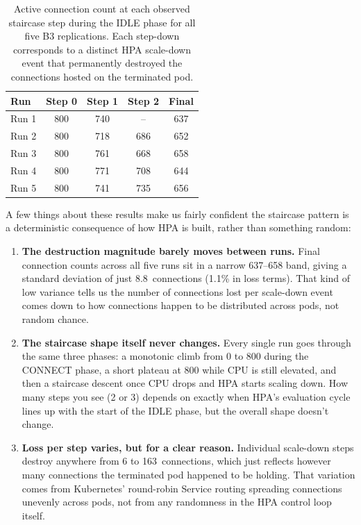 \documentclass[pdflatex,sn-mathphys-num]{sn-jnl}
\theoremstyle{thmstyleone}%
\theoremstyle{thmstyletwo}%
\theoremstyle{thmstylethree}%
\begin{document}
\begin{table}[htbp]
\centering
\caption{Active connection count at each observed staircase step during the IDLE phase
for all five B3 replications. Each step-down corresponds to a distinct HPA scale-down
event that permanently destroyed the connections hosted on the terminated pod.}
\label{tab:b3_steps}
\begin{tabular*}{\textwidth}{@{\extracolsep{\fill}}lcccc@{}}
\toprule
\textbf{Run} & \textbf{Step 0} & \textbf{Step 1} & \textbf{Step 2} & \textbf{Final} \\
\midrule
Run 1 & 800 & 740 &--& 637 \\
Run 2 & 800 & 718 & 686 & 652 \\
Run 3 & 800 & 761 & 668 & 658 \\
Run 4 & 800 & 771 & 708 & 644 \\
Run 5 & 800 & 741 & 735 & 656 \\
\bottomrule
\end{tabular*}
\end{table}

A few things about these results make us fairly confident the staircase pattern is
a deterministic consequence of how HPA is built, rather than something random:

\begin{enumerate}[leftmargin=*]
\item \textbf{The destruction magnitude barely moves between runs.} Final
connection counts across all five runs sit in a narrow 637--658 band, giving a
standard deviation of just 8.8~connections (1.1\% in loss terms). That kind of low
variance tells us the number of connections lost per scale-down event comes down to
how connections happen to be distributed across pods, not random chance.

\item \textbf{The staircase shape itself never changes.} Every single run goes
through the same three phases: a monotonic climb from 0 to 800 during the CONNECT
phase, a short plateau at 800 while CPU is still elevated, and then a staircase
descent once CPU drops and HPA starts scaling down. How many steps you see (2 or 3)
depends on exactly when HPA's evaluation cycle lines up with the start of the IDLE
phase, but the overall shape doesn't change.

\item \textbf{Loss per step varies, but for a clear reason.} Individual scale-down
steps destroy anywhere from 6 to 163~connections, which just reflects however many
connections the terminated pod happened to be holding. That variation comes from
Kubernetes' round-robin Service routing spreading connections unevenly across
pods, not from any randomness in the HPA control loop itself.
\end{enumerate}
\end{document}
